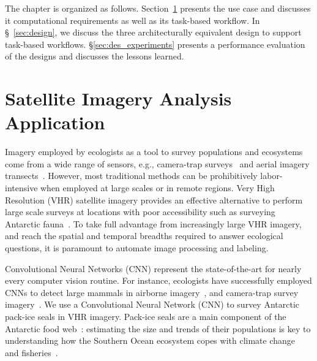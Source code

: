 The chapter is organized as follows.
Section~\ref{sec:ucase} presents the use case and discusses it computational requirements as well as its task-based workflow.
In \S~\ref{sec:design}, we discuss the three architecturally equivalent design to support task-based workflows.
 \S\ref{sec:des_experiments} presents a performance evaluation of the designs and discusses the lessons learned.

\section{Satellite Imagery Analysis Application}
\label{sec:ucase}
Imagery employed by ecologists as a tool to survey populations and ecosystems come from a wide range of sensors, e.g., camera-trap surveys~\cite{karanth1995estimating} and aerial imagery transects~\cite{western2009impact}.
However, most traditional methods can be prohibitively labor-intensive when employed at large scales or in remote regions.
Very High Resolution (VHR) satellite imagery provides an effective alternative to perform large scale surveys at locations with poor accessibility such as surveying Antarctic fauna~\cite{lynch2012detection}.
To take full advantage from increasingly large VHR imagery, and reach the spatial and temporal breadths required to answer ecological questions, it is paramount to automate image processing and labeling.


Convolutional Neural Networks (CNN) represent the state-of-the-art for nearly every computer vision routine.
For instance, ecologists have successfully employed CNNs to detect large mammals in airborne imagery~\cite{kellenberger2018detecting,polzounov2016right}, and camera-trap survey imagery~\cite{norouzzadeh2018automatically}.
We use a Convolutional Neural Network (CNN) to survey Antarctic pack-ice seals in VHR imagery.
Pack-ice seals are a main component of the Antarctic food web~\cite{fabra2008convention}: estimating the size and trends of their populations is key to understanding how the Southern Ocean ecosystem copes with climate change~\cite{hillebrand2018climate} and fisheries~\cite{reid2019climate}.

